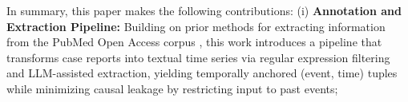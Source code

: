 In summary, this paper makes the following contributions:
(i) \textbf{Annotation and Extraction Pipeline:} Building on prior methods for extracting information from the PubMed Open Access corpus \cite{noroozizadeh2025reconstructing}, this work introduces a pipeline that transforms case reports into textual time series via regular expression filtering and LLM-assisted extraction, yielding temporally anchored (event, time) tuples while minimizing causal leakage by restricting input to past events;
